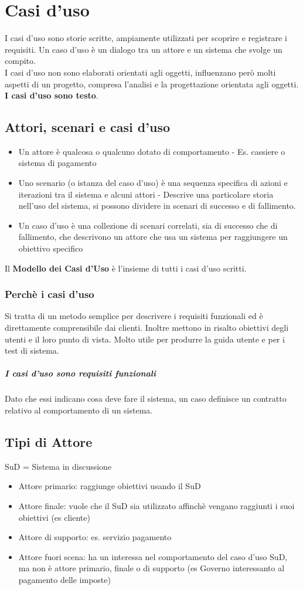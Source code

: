 \chapter{Casi d'uso}
I casi d'uso sono storie scritte, ampiamente utilizzati per scoprire e registrare
i requisiti. Un caso d'uso è un dialogo tra un attore e un sistema che svolge un compito.
\\ I casi d'uso non sono elaborati orientati agli oggetti, influenzano però molti aspetti
di un progetto, compresa l'analisi e la progettazione orientata agli oggetti.
\textbf{I casi d'uso sono testo}.
\section{Attori, scenari e casi d'uso}
\begin{itemize}
    \item Un attore è qualcosa o qualcuno dotato di comportamento - Es. cassiere
    o sistema di pagamento 
    \item Uno scenario (o istanza del caso d'uso) è una sequenza specifica di azioni
    e iterazioni tra il sistema e alcuni attori - Descrive una particolare storia nell'uso
    del sistema, si possono dividere in scenari di successo e di fallimento.
    \item Un caso d'uso è una collezione di scenari correlati, sia di successo che
    di fallimento, che descrivono un attore che usa un sistema per raggiungere un
    obiettivo specifico
\end{itemize}
Il \textbf{Modello dei Casi d'Uso} è l'insieme di tutti i casi d'uso scritti.
\subsection{Perchè i casi d'uso}
Si tratta di un metodo semplice per descrivere i requisiti funzionali ed è
direttamente comprensibile dai clienti. Inoltre mettono in risalto obiettivi degli utenti
e il loro punto di vista. Molto utile per produrre la guida utente e per i test di sistema.
\paragraph*{I casi d'uso sono requisiti funzionali} Dato che essi indicano cosa
deve fare il sistema, un caso definisce un contratto relativo al comportamento
di un sistema.
\section{Tipi di Attore}
SuD = Sistema in discussione
\begin{itemize}
    \item Attore primario: raggiunge obiettivi usando il SuD
    \item Attore finale: vuole che il SuD sia utilizzato affinchè vengano raggiunti
    i suoi obiettivi (es cliente)
    \item Attore di supporto: es. servizio pagamento
    \item Attore fuori scena: ha un interessa nel comportamento del caso d'uso SuD, ma non
    è attore primario, finale o di supporto (es Governo interessanto al pagamento delle imposte)
\end{itemize}
